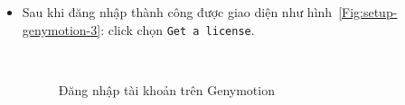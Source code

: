 \documentclass[13pt,a4paper]{extreport}
\begin{document}
\begin{itemize}
\begin{itemize}
					\item Sau khi đăng nhập thành công được giao diện như hình~\ref{Fig:setup-genymotion-3}: click chọn \verb|Get a license|.
						\begin{figure}[!h]
							\begin{center}
								\\
							\end{center}
							\caption{Đăng nhập tài khoản trên Genymotion}
							\label{Fig:setup-genymotion-create}
						\end{figure}
					

\end{itemize}
\end{itemize}
\end{document}
